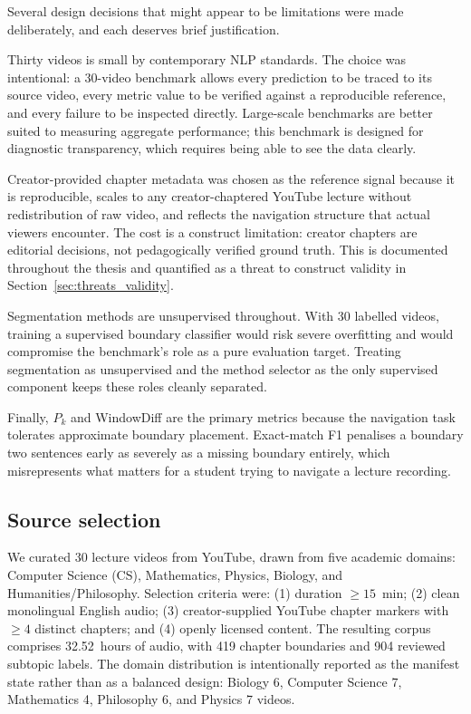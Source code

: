 Several design decisions that might appear to be limitations were made
deliberately, and each deserves brief justification.

Thirty videos is small by contemporary NLP standards. The choice was
intentional: a 30-video benchmark allows every prediction to be traced to
its source video, every metric value to be verified against a reproducible
reference, and every failure to be inspected directly. Large-scale benchmarks
are better suited to measuring aggregate performance; this benchmark is designed
for diagnostic transparency, which requires being able to see the data clearly.

Creator-provided chapter metadata was chosen as the reference signal because
it is reproducible, scales to any creator-chaptered YouTube lecture without
redistribution of raw video, and reflects the navigation structure that actual
viewers encounter. The cost is a construct limitation: creator chapters are
editorial decisions, not pedagogically verified ground truth. This is documented
throughout the thesis and quantified as a threat to construct validity
in Section~\ref{sec:threats_validity}.

Segmentation methods are unsupervised throughout. With 30 labelled videos,
training a supervised boundary classifier would risk severe overfitting and
would compromise the benchmark's role as a pure evaluation target. Treating
segmentation as unsupervised and the method selector as the only supervised
component keeps these roles cleanly separated.

Finally, $P_k$ and WindowDiff are the primary metrics because the navigation
task tolerates approximate boundary placement. Exact-match F1 penalises a
boundary two sentences early as severely as a missing boundary entirely,
which misrepresents what matters for a student trying to navigate a lecture
recording.

\subsection{Source selection}

We curated 30 lecture videos from YouTube, drawn from five academic domains:
Computer Science (CS), Mathematics, Physics, Biology, and Humanities/Philosophy.
Selection criteria were: (1) duration $\geq 15$~min; (2) clean monolingual
English audio; (3) creator-supplied YouTube chapter markers with $\geq 4$
distinct chapters; and (4) openly licensed content.
The resulting corpus comprises 32.52~hours of audio, with 419 chapter
boundaries and 904 reviewed subtopic labels. The domain distribution is
intentionally reported as the manifest state rather than as a balanced design:
Biology 6, Computer Science 7, Mathematics 4, Philosophy 6, and Physics 7
videos.

